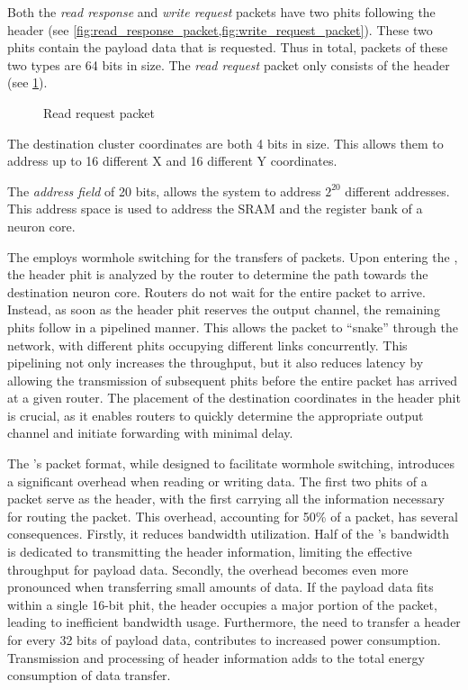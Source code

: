 Both the \textit{read response} and \textit{write request} packets have two phits following the header (see \cref{fig:read_response_packet,fig:write_request_packet}).
These two phits contain the payload data that is requested.
Thus in total, packets of these two types are 64 bits in size.
The \textit{read request} packet only consists of the header (see \cref{fig:read_request_packet}).

\hspace*{0.5em}
\begin{figure}[hbtp]
    \centering
    \begin{adjustbox}{width=0.7\linewidth}
        
    \end{adjustbox}
    \caption{Read request packet}
    \label{fig:read_request_packet}
\end{figure}

The destination cluster coordinates are both 4 bits in size.
This allows them to address up to 16 different X and 16 different Y coordinates.

The \textit{address field} of 20 bits, allows the system to address $2^{20}$ different addresses.
This address space is used to address the SRAM and the register bank of a neuron core.

The \confignoc{} employs wormhole switching for the transfers of packets.
Upon entering the \confignoc{}, the header phit is analyzed by the router to determine the path towards the destination neuron core.
Routers do not wait for the entire packet to arrive.
Instead, as soon as the header phit reserves the output channel, the remaining phits follow in a pipelined manner.
This allows the packet to ``snake'' through the network, with different phits occupying different links concurrently.
This pipelining not only increases the throughput, but it also reduces latency by allowing the transmission of subsequent phits before the entire packet has arrived at a given router.
The placement of the destination coordinates in the header phit is crucial, as it enables routers to quickly determine the appropriate output channel and initiate forwarding with minimal delay.

The \confignoc{}'s packet format, while designed to facilitate wormhole switching, introduces a significant overhead when reading or writing data.
The first two phits of a packet serve as the header, with the first carrying all the information necessary for routing the packet.
This overhead, accounting for 50\% of a packet, has several consequences.
Firstly, it reduces bandwidth utilization.
Half of the \confignoc{}'s bandwidth is dedicated to transmitting the header information, limiting the effective throughput for payload data.
Secondly, the overhead becomes even more pronounced when transferring small amounts of data.
If the payload data fits within a single 16-bit phit, the header occupies a major portion of the packet, leading to inefficient bandwidth usage.
Furthermore, the need to transfer a header for every 32 bits of payload data, contributes to increased power consumption.
Transmission and processing of header information adds to the total energy consumption of data transfer.
